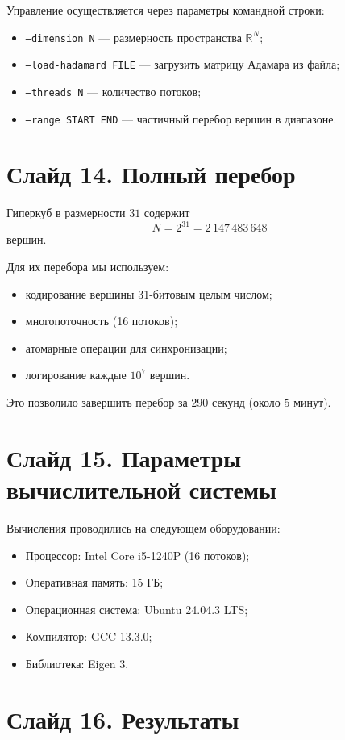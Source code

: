 \documentclass[a4paper,12pt]{article}
\begin{document}
Управление осуществляется через параметры командной строки:
\begin{itemize}
    \item \texttt{--dimension N} — размерность пространства $\mathbb{R}^N$;
    \item \texttt{--load-hadamard FILE} — загрузить матрицу Адамара из файла;
    \item \texttt{--threads N} — количество потоков;
    \item \texttt{--range START END} — частичный перебор вершин в диапазоне.
\end{itemize}

\section*{Слайд 14. Полный перебор}

Гиперкуб в размерности $31$ содержит
\[
N = 2^{31} = 2\,147\,483\,648
\]
вершин.

Для их перебора мы используем:
\begin{itemize}
    \item кодирование вершины 31-битовым целым числом;
    \item многопоточность (16 потоков);
    \item атомарные операции для синхронизации;
    \item логирование каждые $10^7$ вершин.
\end{itemize}

Это позволило завершить перебор за $290$ секунд (около $5$ минут).

\section*{Слайд 15. Параметры вычислительной системы}

Вычисления проводились на следующем оборудовании:
\begin{itemize}
    \item Процессор: Intel Core i5-1240P (16 потоков);
    \item Оперативная память: 15 ГБ;
    \item Операционная система: Ubuntu 24.04.3 LTS;
    \item Компилятор: GCC 13.3.0;
    \item Библиотека: Eigen 3.
\end{itemize}

\section*{Слайд 16. Результаты}
\end{document}
